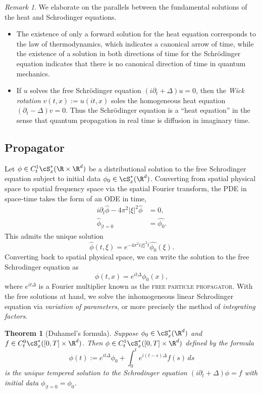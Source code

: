 \documentclass[reqno]{amsart}
\newtheorem{theorem}{Theorem}
\theoremstyle{definition}
\theoremstyle{remark}
\newtheorem*{remark}{Remark}
\renewcommand{\emph}{\textsc}
\begin{document}
\begin{remark}
We elaborate on the parallels between the fundamental solutions of the heat and Schrodinger equations. 
\begin{itemize}
	\item The existence of only a forward solution for the heat equation corresponds to the law of thermodynamics, which indicates a canonical arrow of time, while the existence of a solution in both directions of time for the Schr{\"o}dinger equation indicates that there is no canonical direction of time in quantum mechanics. 
	\item If $u$ solves the free Schr{\"o}dinger equation $(i\partial_t + \Delta)u = 0$, then the \textit{Wick rotation} $v(t, x) := u(it, x)$ soles the homogeneous heat equation $(\partial_t - \Delta)v = 0$. Thus the Schr{\"o}dinger equation is a ``heat equation'' in the sense that quantum propagation in real time is diffusion in imaginary time. 
\end{itemize}	
\end{remark}

\subsection{Propagator}

Let $\phi \in C^1_t \cS^*_x (\R \times \R^d)$ be a distributional solution to the free Schrodinger equation subject to initial data $\phi_0 \in \cS^*_x (\R^d)$. Converting from spatial physical space to spatial frequency space via the spatial Fourier transform, the PDE in space-time takes the form of an ODE in time, 
	\begin{align*}
		i\partial_t \widehat \phi - 4\pi^2 |\xi|^2 \widehat \phi 
			&= 0 , \\
		\widehat{\phi}_{|t = 0}
			&= \widehat{\phi_0}.	
	\end{align*}
This admits the unique solution 
	\[ \widehat \phi (t, \xi) = e^{-4\pi^2 i |\xi|^2 t} \widehat{\phi_0} (\xi). \]
Converting back to spatial physical space, we can write the solution to the free Schrodinger equation as 
	\[ \phi(t, x) = e^{i t \Delta} \phi_0 (x),  \]	
where $e^{it \Delta}$ is a Fourier multiplier known as the \emph{free particle propagator}. 	With the free solutions at hand, we solve the inhomogeneous linear Schrodinger equation via \textit{variation of parameters}, or more precisely the method of \textit{integrating factors}. 

\begin{theorem}[Duhamel's formula]
	Suppose $\phi_0 \in \cS^*_x (\R^d)$ and $f \in C^0_t \cS^*_x ([0, T] \times \R^d)$. Then $\phi \in C^1_t \cS^*_x ([0, T] \times \R^d)$ defined by the formula
		\[ \phi(t) := e^{it \Delta} \phi_0 + \int_0^t e^{i(t - s) \Delta} f(s) \, ds \]
	is the unique tempered solution to the Schrodinger equation $(i \partial_t + \Delta) \phi = f$ with initial data $\phi_{|t = 0} = \phi_0$. 	
\end{theorem}
\end{document}
